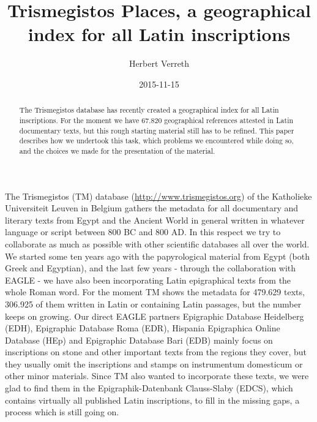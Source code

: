 \documentclass[amsthm,ebook]{saparticle}
\title{Trismegistos Places, a geographical index for all Latin inscriptions}
\author[KUL]{Herbert Verreth\corref{first}}
\date{2015-11-15}
\begin{document}
\maketitle
\begin{abstract}
The Trismegistos database has recently created a geographical index for all Latin inscriptions. For the moment we have
67.820 geographical references attested in Latin documentary texts, but this rough starting material still has to be
refined. This paper describes how we undertook this task, which problems we encountered while doing so, and the choices
we made for the presentation of the material.
\end{abstract}


\noindent The Trismegistos (TM) database (\url{http://www.trismegistos.org}) of the Katholieke Universiteit Leuven in Belgium
gathers the metadata for all documentary and literary texts from Egypt and the Ancient World in general written in
whatever language or script between 800 BC and 800 AD. In this respect we try to collaborate as much as possible with
other scientific databases all over the world. We started some ten years ago with the papyrological material from Egypt
(both Greek and Egyptian), and the last few years - through the collaboration with EAGLE - we have also been
incorporating Latin epigraphical texts from the whole Roman word. For the moment TM shows the metadata for 479.629
texts, 306.925 of them written in Latin or containing Latin passages, but the number keeps on growing. Our direct EAGLE
partners Epigraphic Database Heidelberg (EDH), Epigraphic Database Roma (EDR), Hispania Epigraphica Online Database
(HEp) and Epigraphic Database Bari (EDB) mainly focus on inscriptions on stone and other important texts from the
regions they cover, but they usually omit the inscriptions and stamps on instrumentum domesticum or other minor
materials. Since TM also wanted to incorporate these texts, we were glad to find them in the Epigraphik-Datenbank
Clauss-Slaby (EDCS), which contains virtually all published Latin inscriptions, to fill in the missing gaps, a process
which is still going on.
\end{document}
